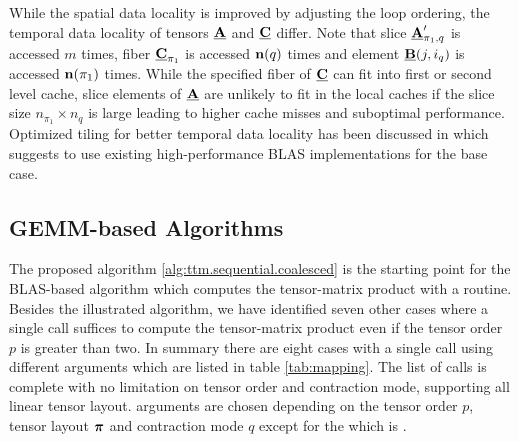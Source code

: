 While the spatial data locality is improved by adjusting the loop ordering, the temporal data locality of tensors $\underline{\mathbf{A}}$ and $\underline{\mathbf{C}}$ differ.
Note that slice $\underline{\mathbf{A}}_{\pi_1,q}'$ is accessed $m$ times, fiber $\underline{\mathbf{C}}_{\pi_1}$ is accessed $\mathbf{n}(q)$ times and element $\underline{\mathbf{B}}(j,i_q)$ is accessed $\mathbf{n}(\pi_1)$ times.
While the specified fiber of $\underline{\mathbf{C}}$ can fit into first or second level cache, slice elements of $\underline{\mathbf{A}}$ are unlikely to fit in the local caches if the slice size $n_{\pi_1} \times n_q$ is large leading to higher cache misses and suboptimal performance.
Optimized tiling for better temporal data locality has been discussed in \cite{goto:2008:gemm} which suggests to use existing high-performance BLAS implementations for the base case.

\subsection{GEMM-based Algorithms}
\label{sec:design:blas.based.algorithm}
The proposed algorithm \ref{alg:ttm.sequential.coalesced} is the starting point for the BLAS-based algorithm which computes the tensor-matrix product with a  routine.
Besides the illustrated algorithm, we have identified seven other cases where a single  call suffices to compute the tensor-matrix product even if the tensor order $p$ is greater than two.
In summary there are eight cases with a single  call using different arguments which are listed in table \ref{tab:mapping}.
The list of  calls is complete with no limitation on tensor order and contraction mode, supporting all linear tensor layout.
 arguments are chosen depending on the tensor order $p$, tensor layout $\boldsymbol{\pi}$ and contraction mode $q$ except for the  which is .


